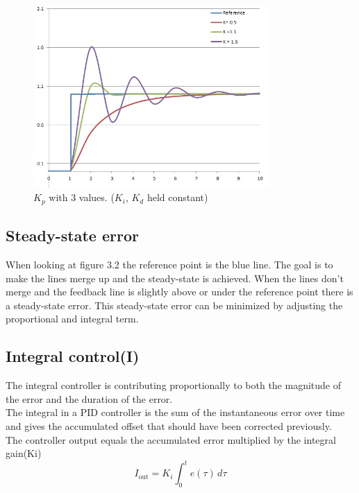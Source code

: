 \begin{figure}[h!]
  \centering
  \includegraphics[width=0.8\textwidth]{figures/PIDP.jpg}
  
  \caption{$K_p$ with 3 values. ($K_i$, $K_d$ held constant)} 
  \label{PID controller}
\end{figure}

\subsection {Steady-state error}
When looking at figure 3.2 the reference point is the blue line. The goal is to make the lines merge up and the steady-state is achieved. When the lines don't merge and the feedback line is slightly above or under the reference point there is a steady-state error. This steady-state error can be minimized by adjusting the proportional and integral term. 

\newpage

\subsection {Integral control(I)}
The integral controller is contributing proportionally to both the magnitude of the error and the duration of the error. \\
The integral in a PID controller is the sum of the instantaneous error over time and gives the accumulated offset that should have been corrected previously. \\ 

The controller output equals the accumulated error multiplied by the integral gain(Ki)\\
$$I_{\mathrm{out}}=K_{i}\int_{0}^{t}{e(\tau)}\,{d\tau}$$ 

